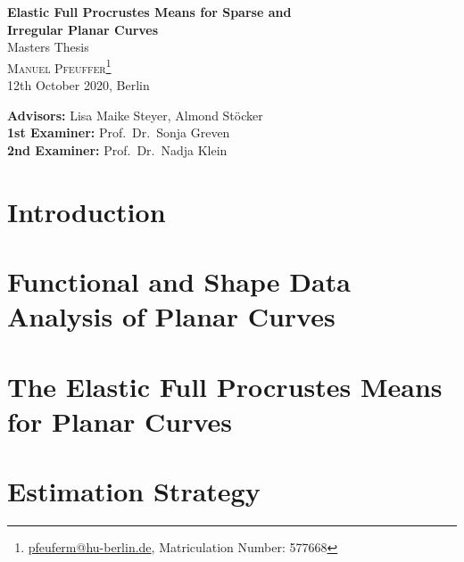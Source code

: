 \documentclass[a4paper,12pt,pagesize,DIV=calc,smallheadings,english]{article}
\begin{document}
\begin{titlepage}

  \vspace*{0.5cm}

  \begin{center}
    {\LARGE\textbf{Elastic Full Procrustes Means for Sparse and\vspace{0.4cm}\\
    Irregular Planar Curves}}
  \vspace{1cm}\\
    {\large Masters Thesis}
  \vspace{0.7cm}\\
  \textsc{Manuel Pfeuffer\footnote{\url{pfeuferm@hu-berlin.de}, Matriculation Number: 577668}}
  \vspace{0.1cm}\\
  12th October 2020, Berlin
  \vspace{1cm}\\

  \vfill
  \end{center}

  \noindent \textbf{Advisors:} Lisa Maike Steyer, Almond Stöcker\\
  \noindent \textbf{1st Examiner:} Prof.\ Dr.\ Sonja Greven\\
  \noindent \textbf{2nd Examiner:} Prof.\ Dr.\ Nadja Klein
  \vspace{0.5em}

\end{titlepage}


\tableofcontents
\newpage


\section{Introduction}
\label{sec:intro}


\section{Functional and Shape Data Analysis of Planar Curves}
\label{sec:theo}


\section{The Elastic Full Procrustes Means for Planar Curves}
\label{sec:mean}


\section{Estimation Strategy}
\label{sec:algo}
\end{document}
